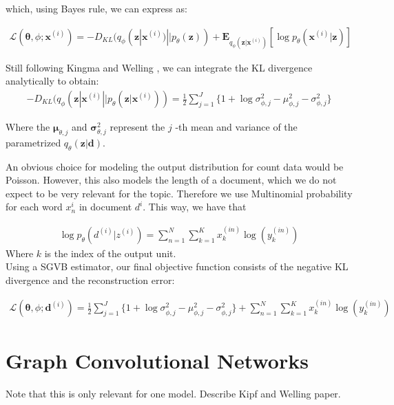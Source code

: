 \documentclass{report}
\begin{document}
which, using Bayes rule, we can express as:

\begin{align}
\mathcal{L}(\mathbf{\theta}, \phi; \mathbf{x}^{(i)}) = -D_{KL}(q_\phi (\mathbf{z}| \mathbf{x}^{(i)})||p_\theta (\mathbf{z})) + \mathbf{E}_{q_\phi(\mathbf{z}|\mathbf{x}^{(i)})}[\log p_\theta (\mathbf{x}^{(i)}|\mathbf{z})]
\end{align}



Still following Kingma and Welling \cite{kingma2013auto}, we can integrate the KL divergence analytically to obtain: \\


\begin{align}
- D_{KL}(q_\phi (\mathbf{z}| \mathbf{x}^{(i)}||p_\theta (\mathbf{z}| \mathbf{x}^{(i)})) = \frac{1}{2}\sum\limits_{j=1}^{J}\{1+\log \sigma_{\phi ,j}^2 - \mu_{\phi,j}^2 - \sigma_{\phi ,j}^2\}
\end{align}

Where the $\mathbf{\mu}_{\theta,j}$ and $\mathbf{\sigma}_{\theta,j}^2$ represent the $j$ -th mean and variance of the parametrized $q_\theta(\mathbf{z}|\mathbf{d})$.

An obvious choice for modeling the output distribution for count data would be Poisson. However, this also models the length of a document, which we do not expect to be very relevant for the topic. Therefore we use Multinomial probability for each word $x_n^{i}$ in document $d^{i}$. This way, we have that

\begin{align}
\log p_{\theta}(d^{(i)}|z^{(i)}) = 
\sum_{n=1}^N
\sum_{k=1}^K x_k^{(in)} \log (y_k^{(in)})
\end{align}
Where $k$ is the index of the output unit.\\


Using a SGVB estimator, our final objective function consists of the negative KL divergence and the reconstruction error:

\begin{align}
\mathcal{L}(\mathbf{\theta}, \phi; \mathbf{d}^{(i)}) = \frac{1}{2}\sum\limits_{j=1}^{J}\{1+\log \sigma_{\phi ,j}^2 - \mu_{\phi,j}^2 - \sigma_{\phi ,j}^2\} 
+ \sum_{n=1}^N
\sum_{k=1}^K x_k^{(in)} \log (y_k^{(in)})
\end{align}

\section{Graph Convolutional Networks}
Note that this is only relevant for one model. Describe Kipf and Welling paper.
\end{document}
